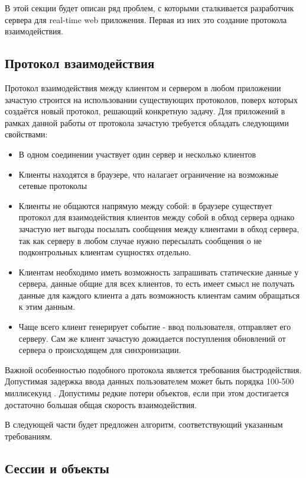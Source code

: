 \documentclass[a4paper,14pt, openany]{book}
\begin{document}
В этой секции будет описан ряд проблем, с которыми сталкивается разработчик сервера для real-time web приложения. Первая из них это создание протокола взаимодействия.

\subsection{Протокол взаимодействия}

Протокол взаимодействия между клиентом и сервером в любом приложении зачастую строится на использовании существующих протоколов, поверх которых создаётся новый протокол, решающий конкретную задачу. Для приложений в рамках данной работы от протокола зачастую требуется обладать следующими свойствами:

\begin{itemize}
  \item В одном соединении участвует один сервер и несколько клиентов
  \item Клиенты находятся в браузере, что налагает ограничение на возможные сетевые протоколы
  \item Клиенты не общаются напрямую между собой: в браузере существует протокол для взаимодействия клиентов между собой в обход сервера \cite{webrtc} однако зачастую нет выгоды посылать сообщения между клиентами в обход сервера, так как серверу в любом случае нужно пересылать сообщения о не подконтрольных клиентам сущностях отдельно.
  \item Клиентам необходимо иметь возможность запрашивать статические данные у сервера, данные общие для всех клиентов, то есть имеет смысл не получать данные для каждого клиента а дать возможность клиентам самим обращаться к этим данным.
  \item Чаще всего клиент генерирует событие - ввод пользователя, отправляет его серверу. Сам же клиент зачастую дожидается поступления обновлений от сервера о происходящем для синхронизации.
\end{itemize}

Важной особенностью подобного протокола является требования быстродействия. Допустимая задержка ввода данных пользователем может быть порядка 100-500 миллисекунд \cite{latencyArticle}. Допустимы редкие потери объектов, если при этом достигается достаточно большая общая скорость взаимодействия.

В следующей части будет предложен алгоритм, соответствующий указанным требованиям. 

\subsection{Сессии и объекты}
\end{document}
